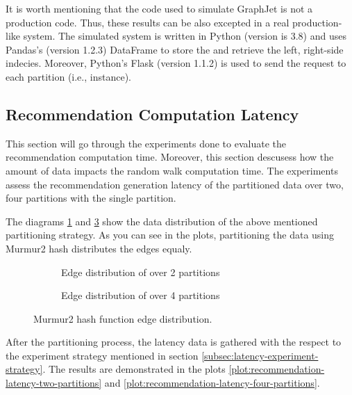 It is worth mentioning that the code used to simulate GraphJet is not a production code. Thus, these results can be also excepted in a real production-like system. The simulated system is written in Python (version is 3.8) and uses Pandas's (version 1.2.3) DataFrame to store the and retrieve the left, right-side indecies. Moreover, Python's Flask (version 1.1.2) is used to send the request to each partition (i.e., instance).


\subsection{Recommendation Computation Latency}
\label{subsec:recommendation-computation-latency}
This section will go through the experiments done to evaluate the recommendation computation time. Moreover, this section descusess how the amount of data impacts the random walk computation time. The experiments assess the recommendation generation latency of the partitioned data over two, four partitions with the single partition.


The diagrams \ref{plot:edge-distribution-2-partitions-murmur2} and \ref{plot:edge-distribution-4-partitions-murmur2} show the data distribution of the above mentioned partitioning strategy. As you can see in the plots, partitioning the data using Murmur2 hash distributes the edges equaly. 

\begin{figure}[ht!]
    \centering
    \begin{subfigure}{\textwidth}
        \centering
        
        \caption{Edge distribution of over 2 partitions}
        \label{plot:edge-distribution-2-partitions-murmur2}
    \end{subfigure}\qquad

    \begin{subfigure}{\textwidth}
        \centering
        
        \caption{Edge distribution of over 4 partitions}
        \label{plot:edge-distribution-4-partitions-murmur2}
    \end{subfigure}\qquad
    \caption{Murmur2 hash function edge distribution.}
\end{figure}


After the partitioning process, the latency data is gathered with the respect to the experiment strategy mentioned in section \ref{subsec:latency-experiment-strategy}. The results are demonstrated in the plots \ref{plot:recommendation-latency-two-partitions} and \ref{plot:recommendation-latency-four-partitions}. 

